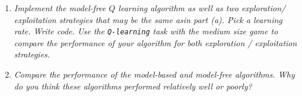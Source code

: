 \documentclass{article}
\begin{document}
\begin{enumerate}
\begin{enumerate}
  \item \emph{Implement the model-free $Q$ learning algorithm as well as two exploration/
  exploitation strategies that may be the same asin part (a). Pick a learning rate. Write 
  code. Use the \texttt{Q-learning} task with the medium size game to compare the 
  performance of your algorithm for both exploration / exploitation strategies.}

  \item \emph{Compare the performance of the model-based and model-free algorithms. Why 
  do you think these algorithms performed relatively well or poorly?}


  \end{enumerate}

\end{enumerate}
\end{document}
